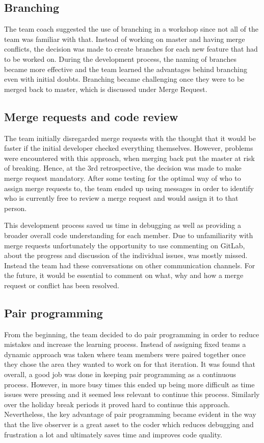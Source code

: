 \documentclass{l3proj}
\begin{document}
\subsection{Branching}
The team coach suggested the use of branching in a workshop since not all of the team was familiar with that. Instead of working on master and having merge conflicts,  the decision was made to create branches for each new feature that had to be worked on. During the development process, the naming of branches became more effective and the team learned the advantages behind branching even with initial doubts. Branching became challenging once they were to be merged back to master, which is discussed under Merge Request.

\subsection{Merge requests and code review}
The team initially disregarded merge requests with the thought that it would be faster if the initial developer checked everything themselves. However, problems were encountered with this approach, when merging back put the master at risk of breaking. Hence, at the 3rd retrospective, the decision was made to make merge request mandatory. After some testing for the optimal way of who to assign merge requests to, the team ended up using messages in order to identify who is currently free to review a merge request and would assign it to that person.

This development process saved us time in debugging as well as providing a broader overall code understanding for each member.  Due to unfamiliarity with merge requests unfortunately the opportunity to use commenting on GitLab, about the progress and discussion of the individual issues, was mostly missed. Instead the team had these conversations on other communication channels. For the future, it would be essential to comment on what, why and how a merge request or conflict has been resolved. 

\subsection{Pair programming}
From the beginning, the team decided to do pair programming in order to reduce mistakes and increase the learning process. Instead of assigning fixed teams a dynamic approach was taken where team members were paired together once they chose the area they wanted to work on for that iteration. It was found that overall, a good job was done in keeping pair programming as a continuous process. However, in more busy times this ended up being more difficult as time issues were pressing and it seemed less relevant to continue this process. Similarly over the holiday break periods it proved hard to continue this approach. Nevertheless, the key advantage of pair programming became evident in the way that the live observer is a great asset to the coder which reduces debugging and frustration a lot and ultimately saves time and improves code quality.
\end{document}
